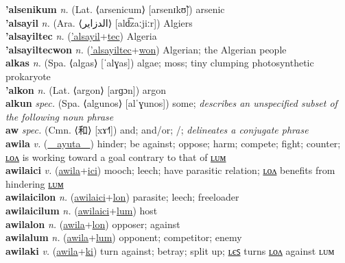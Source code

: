 \textbf{'alsenikum} \textit{n.} (Lat. ⟨arsenicum⟩ [arsenɪkʊ̃])
arsenic \label{'alsenikum} \\
\textbf{'alsayil} \textit{n.} (Ara. ⟨الدزاير⟩ [ald͡zaːjiːr])
Algiers \label{'alsayil} \\
\textbf{'alsayiltec} \textit{n.} (\hyperref['alsayil]{'alsayil}+\hyperref[tec]{tec})
Algeria \label{'alsayiltec} \\
\textbf{'alsayiltecwon} \textit{n.} (\hyperref['alsayiltec]{'alsayiltec}+\hyperref[won]{won})
Algerian; the Algerian people \label{'alsayiltecwon} \\
\textbf{alkas} \textit{n.} (Spa. ⟨algas⟩ [ˈalɣas])
algae; moss; tiny clumping photosynthetic prokaryote \label{alkas} \\
\textbf{'alkon} \textit{n.} (Lat. ⟨argon⟩ [arɡɔn])
argon \label{'alkon} \\
\textbf{alkun} \textit{spec.} (Spa. ⟨algunos⟩ [alˈɣunos])
some; \textit{describes an unspecified subset of the following noun phrase} \label{alkun} \\
\textbf{aw} \textit{spec.} (Cmn. ⟨和⟩ [xɤ˧˥])
and; and/or; /; \textit{delineates a conjugate phrase} \label{aw} \\
\textbf{awila} \textit{v.} (\hyperref[ayuta]{~~ayuta~~})
hinder; be against; oppose; harm; compete; fight; counter; \hyperref[awilalon]{ʟᴏᴧ} is working toward a goal contrary to that of \hyperref[awilalum]{ʟᴜᴍ} \label{awila} \\
\textbf{awilaici} \textit{v.} (\hyperref[awila]{awila}+\hyperref[ici]{ici})
mooch; leech; have parasitic relation; \hyperref[awilaicilon]{ʟᴏᴧ} benefits from hindering \hyperref[awilaicilum]{ʟᴜᴍ} \label{awilaici} \\
\textbf{awilaicilon} \textit{n.} (\hyperref[awilaici]{awilaici}+\hyperref[lon]{lon})
parasite; leech; freeloader \label{awilaicilon} \\
\textbf{awilaicilum} \textit{n.} (\hyperref[awilaici]{awilaici}+\hyperref[lum]{lum})
host \label{awilaicilum} \\
\textbf{awilalon} \textit{n.} (\hyperref[awila]{awila}+\hyperref[lon]{lon})
opposer; against \label{awilalon} \\
\textbf{awilalum} \textit{n.} (\hyperref[awila]{awila}+\hyperref[lum]{lum})
opponent; competitor; enemy \label{awilalum} \\
\textbf{awilaki} \textit{v.} (\hyperref[awila]{awila}+\hyperref[ki]{ki})
turn against; betray; split up; \hyperref[awilakiles]{ʟєꜱ} turns \hyperref[awilakilon]{ʟᴏᴧ} against ʟᴜᴍ \label{awilaki} \\
